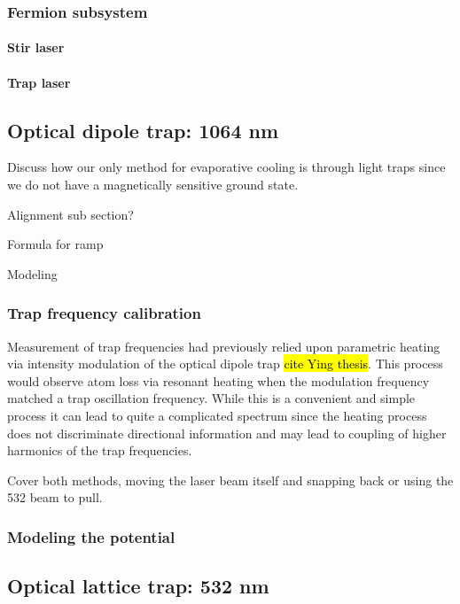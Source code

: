 \subsubsection{Fermion subsystem}

\paragraph{Stir laser}

\paragraph{Trap laser}



\subsection{Optical dipole trap: 1064 nm} \label{ssec:1064sys}

Discuss how our only method for evaporative cooling is through light traps since we do not have a magnetically sensitive ground state.

Alignment sub section?

Formula for ramp

Modeling

\subsubsection{Trap frequency calibration} \label{sssec:1064_trap_freq}

Measurement of trap frequencies had previously relied upon parametric heating via intensity modulation of the optical dipole trap \hl{cite Ying thesis}. This process would observe atom loss via resonant heating when the modulation frequency matched a trap oscillation frequency. While this is a convenient and simple process it can lead to quite a complicated spectrum since the heating process does not discriminate directional information and may lead to coupling of higher harmonics of the trap frequencies. 

Cover both methods, moving the laser beam itself and snapping back or using the 532 beam to pull.

\subsubsection{Modeling the potential} \label{sssec:1064_modeling}

\subsection{Optical lattice trap: 532 nm} \label{ssec:532sys}

